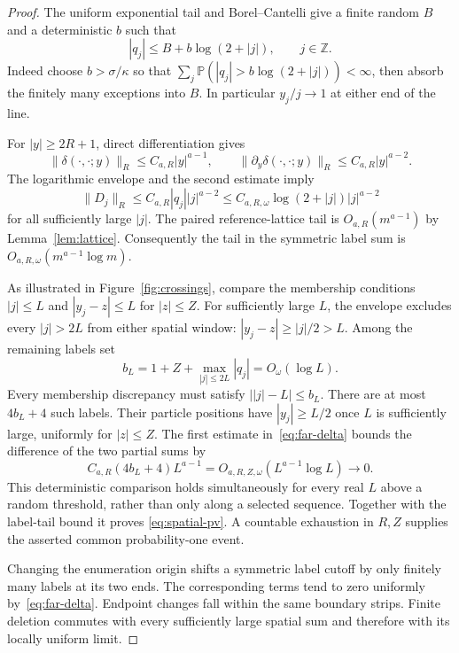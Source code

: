 \documentclass[11pt]{article}
\theoremstyle{remark}\newtheorem{remark}[theorem]{Remark}
\newcommand{\Prob}{\mathbb P}
\newcommand{\Z}{\mathbb Z}
\begin{document}
\begin{proof}
The uniform exponential tail and Borel--Cantelli give a finite
random $B$ and a deterministic $b$ such that
\begin{equation}\label{eq:log-envelope}
 |q_j|\le B+b\log(2+|j|),\qquad j\in\Z.
\end{equation}
Indeed choose $b>\sigma/\kappa$ so that
$\sum_j\Prob(|q_j|>b\log(2+|j|))<\infty$, then absorb the
finitely many exceptions into $B$. In particular $y_j/j\to1$
at either end of the line.

For $|y|\ge2R+1$, direct differentiation gives
\begin{equation}\label{eq:far-delta}
 \|\delta(\cdot,\cdot;y)\|_R\le C_{a,R}|y|^{a-1},\qquad
 \|\partial_y\delta(\cdot,\cdot;y)\|_R
                                  \le C_{a,R}|y|^{a-2}.
\end{equation}
The logarithmic envelope and the second estimate imply
\[
 \|D_j\|_R\le C_{a,R}|q_j||j|^{a-2}
       \le C_{a,R,\omega}\log(2+|j|)|j|^{a-2}
\]
for all sufficiently large $|j|$. The paired reference-lattice
tail is $O_{a,R}(m^{a-1})$ by Lemma~\ref{lem:lattice}.
Consequently the tail in the symmetric label sum is
$O_{a,R,\omega}(m^{a-1}\log m)$.

As illustrated in Figure~\ref{fig:crossings}, compare the membership conditions $|j|\le L$ and
$|y_j-z|\le L$ for $|z|\le Z$. For sufficiently large $L$,
the envelope excludes every $|j|>2L$ from either spatial window:
$|y_j-z|\ge|j|/2>L$. Among the remaining labels set
\[
 b_L=1+Z+\max_{|j|\le2L}|q_j|=O_\omega(\log L).
\]
Every membership discrepancy must satisfy
$\bigl||j|-L\bigr|\le b_L$. There are at most $4b_L+4$
such labels. Their particle positions have $|y_j|\ge L/2$
once $L$ is sufficiently large, uniformly for $|z|\le Z$.
The first estimate in~\eqref{eq:far-delta} bounds the difference
of the two partial sums by
\[
 C_{a,R}(4b_L+4)L^{a-1}
          =O_{a,R,Z,\omega}(L^{a-1}\log L)\longrightarrow0.
\]
This deterministic comparison holds simultaneously for every real
$L$ above a random threshold, rather than only along a selected
sequence. Together with the label-tail bound it proves
\eqref{eq:spatial-pv}. A countable exhaustion in $R,Z$ supplies
the asserted common probability-one event.

Changing the enumeration origin shifts a symmetric label cutoff
by only finitely many labels at its two ends. The corresponding
terms tend to zero uniformly by~\eqref{eq:far-delta}. Endpoint
changes fall within the same boundary strips. Finite deletion
commutes with every sufficiently large spatial sum and therefore
with its locally uniform limit.
\end{proof}
\end{document}
